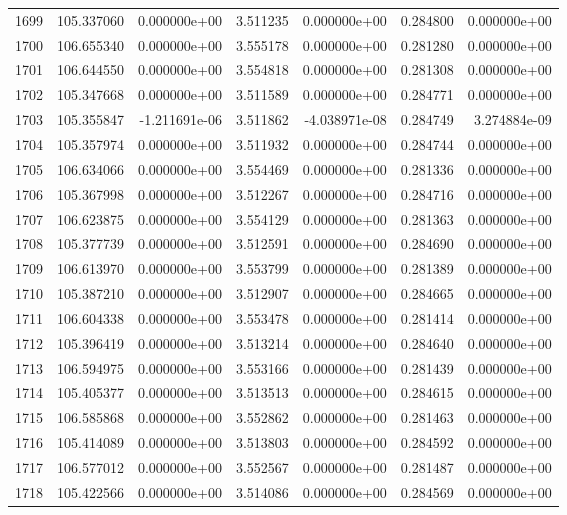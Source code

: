 \begin{tabular}{rrrrrrr}
1699 & 105.337060 &  0.000000e+00 &  3.511235 &  0.000000e+00 &    0.284800 &  0.000000e+00 \\
1700 & 106.655340 &  0.000000e+00 &  3.555178 &  0.000000e+00 &    0.281280 &  0.000000e+00 \\
1701 & 106.644550 &  0.000000e+00 &  3.554818 &  0.000000e+00 &    0.281308 &  0.000000e+00 \\
1702 & 105.347668 &  0.000000e+00 &  3.511589 &  0.000000e+00 &    0.284771 &  0.000000e+00 \\
1703 & 105.355847 & -1.211691e-06 &  3.511862 & -4.038971e-08 &    0.284749 &  3.274884e-09 \\
1704 & 105.357974 &  0.000000e+00 &  3.511932 &  0.000000e+00 &    0.284744 &  0.000000e+00 \\
1705 & 106.634066 &  0.000000e+00 &  3.554469 &  0.000000e+00 &    0.281336 &  0.000000e+00 \\
1706 & 105.367998 &  0.000000e+00 &  3.512267 &  0.000000e+00 &    0.284716 &  0.000000e+00 \\
1707 & 106.623875 &  0.000000e+00 &  3.554129 &  0.000000e+00 &    0.281363 &  0.000000e+00 \\
1708 & 105.377739 &  0.000000e+00 &  3.512591 &  0.000000e+00 &    0.284690 &  0.000000e+00 \\
1709 & 106.613970 &  0.000000e+00 &  3.553799 &  0.000000e+00 &    0.281389 &  0.000000e+00 \\
1710 & 105.387210 &  0.000000e+00 &  3.512907 &  0.000000e+00 &    0.284665 &  0.000000e+00 \\
1711 & 106.604338 &  0.000000e+00 &  3.553478 &  0.000000e+00 &    0.281414 &  0.000000e+00 \\
1712 & 105.396419 &  0.000000e+00 &  3.513214 &  0.000000e+00 &    0.284640 &  0.000000e+00 \\
1713 & 106.594975 &  0.000000e+00 &  3.553166 &  0.000000e+00 &    0.281439 &  0.000000e+00 \\
1714 & 105.405377 &  0.000000e+00 &  3.513513 &  0.000000e+00 &    0.284615 &  0.000000e+00 \\
1715 & 106.585868 &  0.000000e+00 &  3.552862 &  0.000000e+00 &    0.281463 &  0.000000e+00 \\
1716 & 105.414089 &  0.000000e+00 &  3.513803 &  0.000000e+00 &    0.284592 &  0.000000e+00 \\
1717 & 106.577012 &  0.000000e+00 &  3.552567 &  0.000000e+00 &    0.281487 &  0.000000e+00 \\
1718 & 105.422566 &  0.000000e+00 &  3.514086 &  0.000000e+00 &    0.284569 &  0.000000e+00 \\

\end{tabular}

